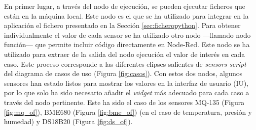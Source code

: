 En primer lugar, a través del nodo de ejecución, se pueden ejecutar ficheros que están en la máquina local. Este nodo es el que se ha utilizado para integrar en la aplicación el fichero presentado en la Sección \ref{sec:ficheropython}. Para obtener individualmente el valor de cada sensor se ha utilizado otro nodo ---llamado nodo función--- que permite incluir código directamente en Node-Red. Este nodo se ha utilizado para extraer de la salida del nodo ejecución el valor de interés en cada caso. Este proceso corresponde a las diferentes elipses salientes de \textit{sensors script} del diagrama de casos de uso (Figura \ref{fig:casos}). Con estos dos nodos, algunos sensores han estado listos para mostrar los valores en la interfaz de usuario (IU), por lo que solo ha sido necesario añadir el \textit{widget} más adecuado para cada caso a través del nodo pertinente. Este ha sido el caso de los sensores MQ-135 (Figura \ref{fig:mq_of}), BME680 (Figura \ref{fig:bme_of}) (en el caso de temperatura, presión y humedad) y DS18B20 (Figura \ref{fig:ds_of}).\\

